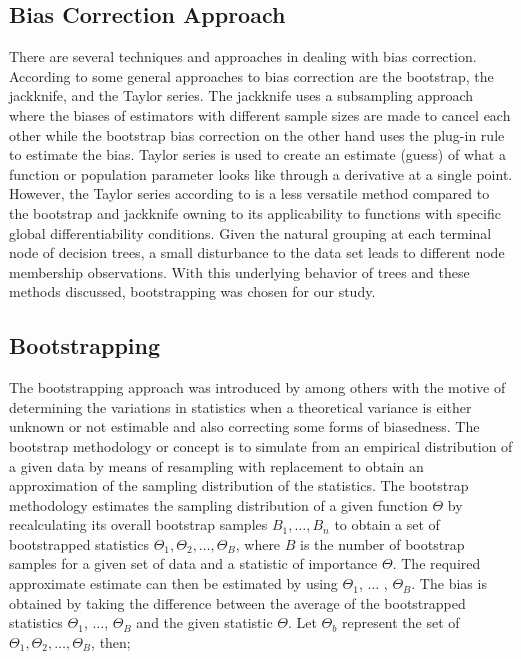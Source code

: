 \subsection{ Bias Correction Approach}
There are several techniques and approaches in dealing with bias correction. According to \cite{jiao2017bias} some general approaches to bias correction are the bootstrap, the jackknife, and the Taylor series. The jackknife uses a subsampling approach where the biases of estimators with different sample sizes are made to cancel each other while the bootstrap bias correction on the other hand uses the plug-in rule to estimate the bias. Taylor series is used to create an estimate (guess) of what a function or population parameter looks like through a derivative at a single point. However, the Taylor series according to \citep{jiao2017bias} is a less versatile method compared to the bootstrap and jackknife owning to its applicability to functions with specific global differentiability conditions. Given the natural grouping at each terminal node of decision trees, a small disturbance to the data set leads to different node membership observations. With this underlying behavior of trees and these methods discussed, bootstrapping \citep{tibshirani1993introduction} was chosen for our study. 


\subsection{Bootstrapping}

The bootstrapping approach was introduced by \cite{efron19791977} among others with the motive of determining the variations in statistics when a theoretical variance is either unknown or not estimable and also correcting some forms of biasedness. The bootstrap methodology or concept is to simulate from an empirical distribution of a given data by means of resampling with replacement to obtain an approximation of the sampling distribution of the statistics. The bootstrap methodology estimates the sampling distribution of a given function $\Theta$ by recalculating its overall bootstrap samples $B_1, \ldots, B_n$ to obtain a set of bootstrapped statistics $\Theta_1, \Theta_2, \ldots, \Theta_B$, where $B$ is the number of bootstrap samples for a given set of data and a statistic of importance $\Theta$. The required approximate estimate can then be estimated by using $\Theta_1$, $\ldots$ , $\Theta_B$. The bias is obtained by taking the difference between the average of the bootstrapped statistics $\Theta_1$, $\ldots$, $\Theta_B$ and the given statistic $\Theta$. Let $\Theta_{b}$ represent the set of $\Theta_1, \Theta_2, \ldots, \Theta_B$, then;

